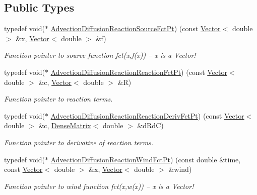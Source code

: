 \subsection*{Public Types}
\begin{DoxyCompactItemize}
\item 
typedef void($\ast$ \hyperlink{classoomph_1_1AdvectionDiffusionReactionEquations_a3443e579e62414ecc50595403982e686}{Advection\+Diffusion\+Reaction\+Source\+Fct\+Pt}) (const \hyperlink{classoomph_1_1Vector}{Vector}$<$ double $>$ \&x, \hyperlink{classoomph_1_1Vector}{Vector}$<$ double $>$ \&f)
\begin{DoxyCompactList}\small\item\em Function pointer to source function fct(x,f(x)) -- x is a Vector! \end{DoxyCompactList}\item 
typedef void($\ast$ \hyperlink{classoomph_1_1AdvectionDiffusionReactionEquations_a74f8f0492147a5600b075cc64479f850}{Advection\+Diffusion\+Reaction\+Reaction\+Fct\+Pt}) (const \hyperlink{classoomph_1_1Vector}{Vector}$<$ double $>$ \&c, \hyperlink{classoomph_1_1Vector}{Vector}$<$ double $>$ \&R)
\begin{DoxyCompactList}\small\item\em Function pointer to reaction terms. \end{DoxyCompactList}\item 
typedef void($\ast$ \hyperlink{classoomph_1_1AdvectionDiffusionReactionEquations_af7afb472439d8e83b825c0a3c03190a7}{Advection\+Diffusion\+Reaction\+Reaction\+Deriv\+Fct\+Pt}) (const \hyperlink{classoomph_1_1Vector}{Vector}$<$ double $>$ \&c, \hyperlink{classoomph_1_1DenseMatrix}{Dense\+Matrix}$<$ double $>$ \&d\+RdC)
\begin{DoxyCompactList}\small\item\em Function pointer to derivative of reaction terms. \end{DoxyCompactList}\item 
typedef void($\ast$ \hyperlink{classoomph_1_1AdvectionDiffusionReactionEquations_a2fff621b5b44c64bd5b3f0412201055f}{Advection\+Diffusion\+Reaction\+Wind\+Fct\+Pt}) (const double \&time, const \hyperlink{classoomph_1_1Vector}{Vector}$<$ double $>$ \&x, \hyperlink{classoomph_1_1Vector}{Vector}$<$ double $>$ \&wind)
\begin{DoxyCompactList}\small\item\em Function pointer to wind function fct(x,w(x)) -- x is a Vector! \end{DoxyCompactList}\end{DoxyCompactItemize}
